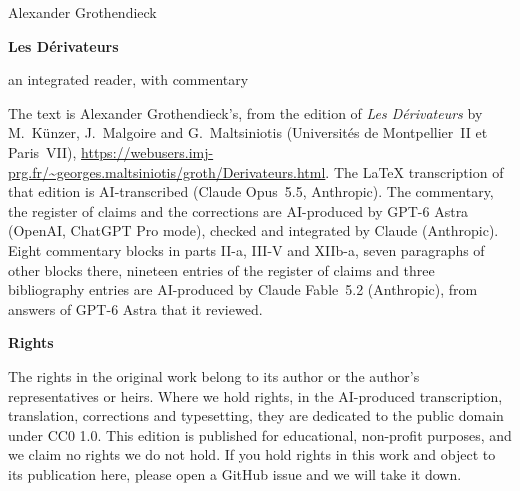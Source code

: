 \documentclass[11pt,oneside]{book}
\begin{document}
\frontmatter
\begin{titlepage}
\centering
\vspace*{0.24\textheight}
{\Large Alexander Grothendieck\par}
\vspace{2.2em}
{\Huge\bfseries Les Dérivateurs\par}
\vspace{2.2em}
{\Large an integrated reader, with commentary\par}
\vfill
\end{titlepage}
\setcounter{page}{2}
\thispagestyle{empty}
\noindent The text is Alexander Grothendieck's, from the edition of \emph{Les Dérivateurs} by M.~Künzer,
J.~Malgoire and G.~Maltsiniotis (Universités de Montpellier~II et Paris~VII),
\url{https://webusers.imj-prg.fr/~georges.maltsiniotis/groth/Derivateurs.html}. The \LaTeX{} transcription of that
edition is AI-transcribed (Claude Opus~5.5, Anthropic). The commentary, the register of claims and the corrections
are AI-produced by GPT-6 Astra (OpenAI, ChatGPT Pro mode), checked and integrated by Claude (Anthropic). Eight
commentary blocks in parts II-a, III-V and XIIb-a, seven paragraphs of other blocks there, nineteen entries of the
register of claims and three bibliography entries are AI-produced by Claude Fable~5.2 (Anthropic), from answers of
GPT-6 Astra that it reviewed.

\bigskip
\noindent\textbf{Rights}

\smallskip
\noindent The rights in the original work belong to its author or the author's representatives or heirs. Where we
hold rights, in the AI-produced transcription, translation, corrections and typesetting, they are dedicated to the
public domain under CC0 1.0. This edition is published for educational, non-profit purposes, and we claim no rights we
do not hold. If you hold rights in this work and object to its publication here, please open a GitHub issue and we will
take it down.
\end{document}
